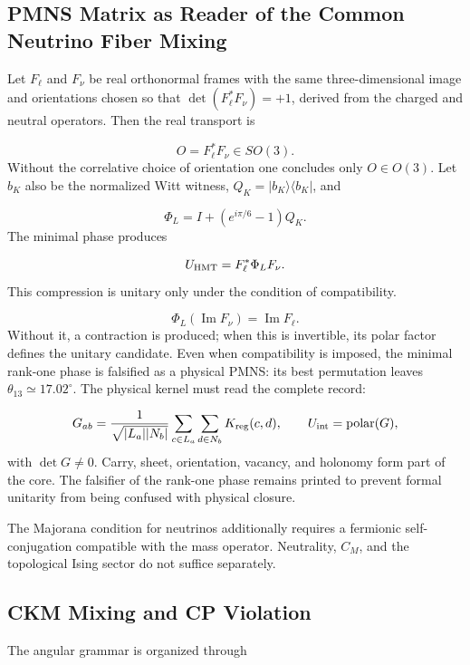 
\subsection{PMNS Matrix as Reader of the Common Neutrino Fiber Mixing}
Let \(F_\ell\) and \(F_\nu\) be real orthonormal frames with the same three-dimensional image and orientations chosen so that \(\det(F_\ell^*F_\nu)=+1\), derived from the charged and neutral operators. Then the real transport is

\[
O=F_\ell^*F_\nu\in SO(3).
\]
Without the correlative choice of orientation one concludes only \(O\in O(3)\). Let \(b_K\) also be the normalized Witt witness, \(Q_K=|b_K\rangle\langle b_K|\), and

\[
\Phi_L=I+(e^{i\pi/6}-1)Q_K.
\]
The minimal phase produces

\[
U_{\rm HMT}=F_\ell^*\Phi_LF_\nu.
\]
This compression is unitary only under the condition of compatibility.

\[
\Phi_L(\operatorname{Im}F_\nu)=\operatorname{Im}F_\ell.
\]
Without it, a contraction is produced; when this is invertible, its polar factor defines the unitary candidate. Even when compatibility is imposed, the minimal rank-one phase is falsified as a physical PMNS: its best permutation leaves \(\theta_{13}\simeq17.02^\circ\). The physical kernel must read the complete record:

\[
G_{ab}=
\frac1{\sqrt{|L_a||N_b|}}
\sum_{c\in L_a}\sum_{d\in N_b}K_{\rm reg}(c,d),
\qquad
U_{\rm int}=\operatorname{polar}(G),
\]
with \(\det G\ne0\). Carry, sheet, orientation, vacancy, and holonomy form part of the core. The falsifier of the rank-one phase remains printed to prevent formal unitarity from being confused with physical closure.

The Majorana condition for neutrinos additionally requires a fermionic self-conjugation compatible with the mass operator. Neutrality, \(C_M\), and the topological Ising sector do not suffice separately.

\subsection{CKM Mixing and CP Violation}
The angular grammar is organized through

